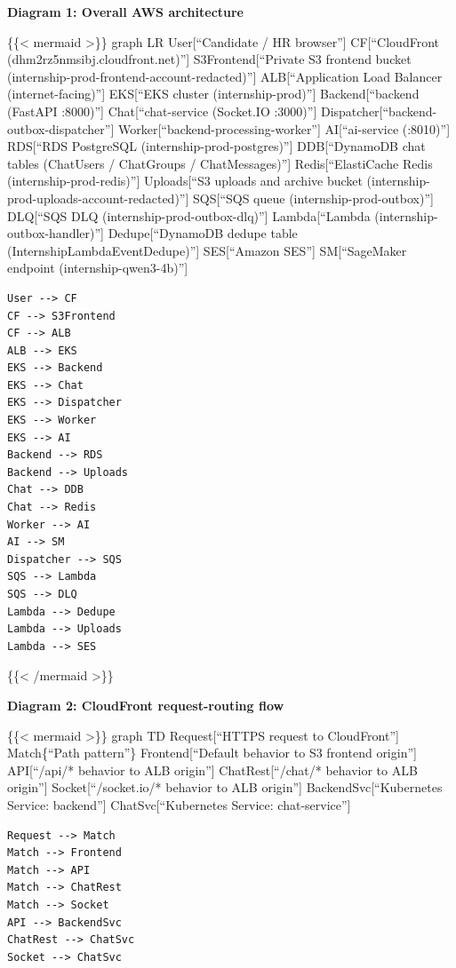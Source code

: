 \vspace{0.5em}\noindent\textbf{Diagram 1: Overall AWS
architecture}\par

\{\{\textless{} mermaid \textgreater\}\} graph LR User{[}``Candidate /
HR browser''{]} CF{[}``CloudFront (dhm2rz5nmsibj.cloudfront.net)''{]}
S3Frontend{[}``Private S3 frontend bucket
(internship-prod-frontend-account-redacted)''{]} ALB{[}``Application
Load Balancer (internet-facing)''{]} EKS{[}``EKS cluster
(internship-prod)''{]} Backend{[}``backend (FastAPI :8000)''{]}
Chat{[}``chat-service (Socket.IO :3000)''{]}
Dispatcher{[}``backend-outbox-dispatcher''{]}
Worker{[}``backend-processing-worker''{]} AI{[}``ai-service (:8010)''{]}
RDS{[}``RDS PostgreSQL (internship-prod-postgres)''{]} DDB{[}``DynamoDB
chat tables (ChatUsers / ChatGroups / ChatMessages)''{]}
Redis{[}``ElastiCache Redis (internship-prod-redis)''{]} Uploads{[}``S3
uploads and archive bucket
(internship-prod-uploads-account-redacted)''{]} SQS{[}``SQS queue
(internship-prod-outbox)''{]} DLQ{[}``SQS DLQ
(internship-prod-outbox-dlq)''{]} Lambda{[}``Lambda
(internship-outbox-handler)''{]} Dedupe{[}``DynamoDB dedupe table
(InternshipLambdaEventDedupe)''{]} SES{[}``Amazon SES''{]}
SM{[}``SageMaker endpoint (internship-qwen3-4b)''{]}

\begin{verbatim}
User --> CF
CF --> S3Frontend
CF --> ALB
ALB --> EKS
EKS --> Backend
EKS --> Chat
EKS --> Dispatcher
EKS --> Worker
EKS --> AI
Backend --> RDS
Backend --> Uploads
Chat --> DDB
Chat --> Redis
Worker --> AI
AI --> SM
Dispatcher --> SQS
SQS --> Lambda
SQS --> DLQ
Lambda --> Dedupe
Lambda --> Uploads
Lambda --> SES
\end{verbatim}

\{\{\textless{} /mermaid \textgreater\}\}

\vspace{0.5em}\noindent\textbf{Diagram 2: CloudFront request-routing
flow}\par

\{\{\textless{} mermaid \textgreater\}\} graph TD Request{[}``HTTPS
request to CloudFront''{]} Match\{``Path pattern''\}
Frontend{[}``Default behavior to S3 frontend origin''{]} API{[}``/api/*
behavior to ALB origin''{]} ChatRest{[}``/chat/* behavior to ALB
origin''{]} Socket{[}``/socket.io/* behavior to ALB origin''{]}
BackendSvc{[}``Kubernetes Service: backend''{]} ChatSvc{[}``Kubernetes
Service: chat-service''{]}

\begin{verbatim}
Request --> Match
Match --> Frontend
Match --> API
Match --> ChatRest
Match --> Socket
API --> BackendSvc
ChatRest --> ChatSvc
Socket --> ChatSvc
\end{verbatim}

